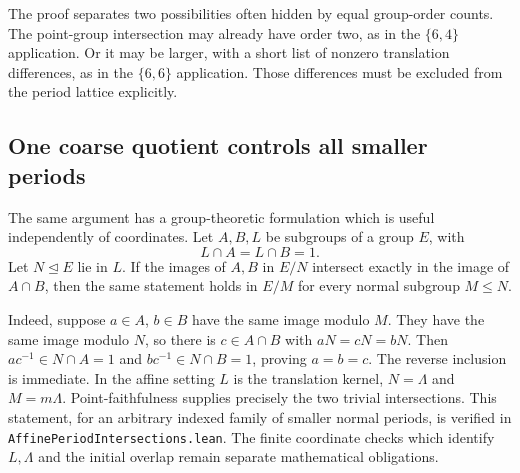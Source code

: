 The proof separates two possibilities often hidden by equal group-order
counts. The point-group intersection may already have order two, as in
the \(\{6,4\}\) application. Or it may be larger, with a short list of
nonzero translation differences, as in the \(\{6,6\}\) application. Those
differences must be excluded from the period lattice explicitly.

\subsection*{One coarse quotient controls all smaller periods}
The same argument has a group-theoretic formulation which is useful independently of coordinates. Let $A,B,L$ be subgroups of a group $E$, with
\[
 L\cap A=L\cap B=1.
\]
Let $N\unlhd E$ lie in $L$. If the images of $A,B$ in $E/N$ intersect exactly in the image of $A\cap B$, then the same statement holds in $E/M$ for every normal subgroup $M\le N$.

Indeed, suppose $a\in A$, $b\in B$ have the same image modulo $M$. They have the same image modulo $N$, so there is $c\in A\cap B$ with $aN=cN=bN$. Then $ac^{-1}\in N\cap A=1$ and $bc^{-1}\in N\cap B=1$, proving $a=b=c$. The reverse inclusion is immediate. In the affine setting $L$ is the translation kernel, $N=\Lambda$ and $M=m\Lambda$. Point-faithfulness supplies precisely the two trivial intersections. This statement, for an arbitrary indexed family of smaller normal periods, is verified in \texttt{AffinePeriodIntersections.lean}. The finite coordinate checks which identify $L,\Lambda$ and the initial overlap remain separate mathematical obligations.
